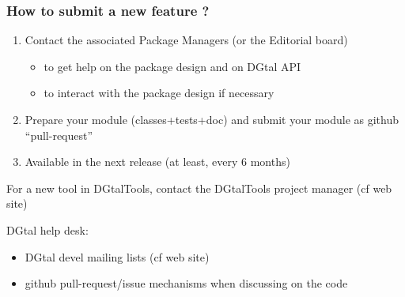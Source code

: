 \documentclass[8pt]{beamer}
\begin{document}
\begin{frame}
  \frametitle{How to submit a new feature ?}

  \begin{enumerate}
  \item Contact the associated Package Managers (or the Editorial
    board) 
    \begin{itemize}
    \item to get help on the package design and on DGtal API
    \item to interact with the package design if necessary
    \end{itemize}

  \item Prepare your module (classes+tests+doc) and submit your module
    as github ``pull-request''

  \item Available in the next release (at least, every 6 months)
  \end{enumerate}

\vspace{0.5cm}

For a new tool in  DGtalTools, contact the DGtalTools project manager
  (cf web site) 

\vspace{1cm}

\alert{DGtal help desk:}
\begin{itemize}
\item DGtal devel mailing lists (cf web site)
\item github pull-request/issue mechanisms when discussing on the code 
\end{itemize}

\end{frame}
\end{document}
